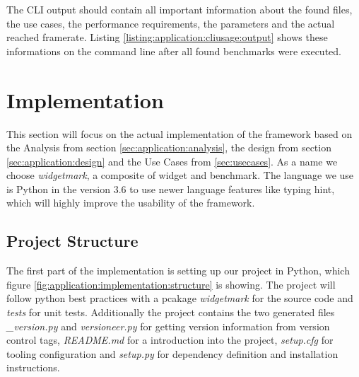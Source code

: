 

The CLI output should contain all important information about the found files,
the use cases, the performance requirements, the parameters and the actual
reached framerate. Listing \ref{listing:application:cliusage:output} shows these
informations on the command line after all found benchmarks were executed.





\section{Implementation} \label{sec:application:implementation}

This section will focus on the actual implementation of the framework based on
the Analysis from section \ref{sec:application:analysis}, the design from
section \ref{sec:application:design} and the Use Cases from \ref{sec:usecases}.
As a name we choose \emph{widgetmark}, a composite of widget and benchmark. The
language we use is Python in the version 3.6 to use newer language features like
typing hint, which will highly improve the usability of the framework.

\subsection{Project Structure}

The first part of the implementation is setting up our project in Python, which
figure \ref{fig:application:implementation:structure} is showing. The project
will follow python best practices with a pcakage \emph{widgetmark} for the
source code and \emph{tests} for unit tests. Additionally the project contains
the two generated files \emph{\_version.py} and \emph{versioneer.py} for getting
version information from version control tags, \emph{README.md} for a
introduction into the project, \emph{setup.cfg} for tooling configuration and
\emph{setup.py} for dependency definition and installation instructions.

